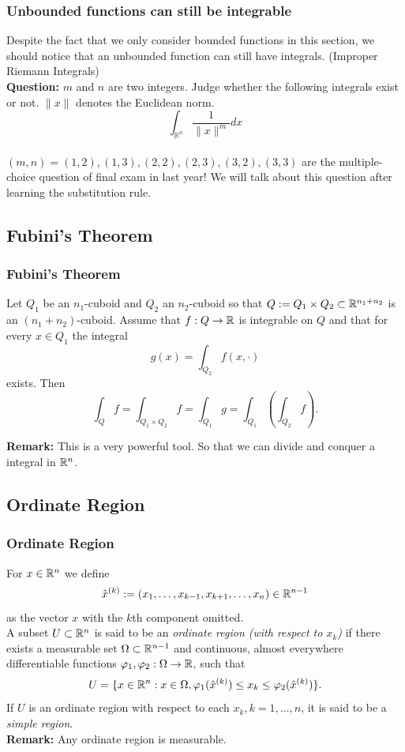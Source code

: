 \documentclass[12pt, t]{beamer}
\renewcommand{\emph}[1]{{\color{Turquoise3}\textsl{#1}}}
\newcommand{\nullspace}{~\\[15pt]}
\newcommand{\Remark}{\textbf{Remark: }}
\newcommand{\Question}{\textbf{Question: }}
\begin{document}
\begin{frame}
    \frametitle{Unbounded functions can still be integrable}
    Despite the fact that we only consider bounded functions in this section, we should notice that an unbounded function can still have integrals. (Improper Riemann Integrals)
    \nullspace
    \Question
    $m$ and $n$ are two integers. Judge whether the following integrals exist or not. $\|x\|$ denotes the Euclidean norm.
    \[
        \int_{\mathbb{R}^{n}} \frac{1}{\|x\|^{m}} d x
    \]
    \nullspace
    $(m, n)=(1,2),(1,3),(2,2),(2,3),(3,2),(3,3)$ are the multiple-choice question of final exam in last year! We will talk about this question after learning the substitution rule.

\end{frame}

\subsection{Fubini's Theorem}
\begin{frame}
    \frametitle{Fubini's Theorem}
    Let $Q_1$ be an $n_1$-cuboid and $Q_2$ an $n_2$-cuboid so that $Q:=Q_1\times Q_2\subset\mathbb{R}^{n_1+n_2}$ is an $(n_1+n_2)$-cuboid. Assume that $f:Q\to\mathbb{R}$ is integrable on $Q$ and that for every $x\in Q_1$ the integral
    \[g(x)=\int_{Q_2}f(x,\cdot)\]
    exists. Then
    \[\int_Qf=\int_{Q_1\times Q_2}f=\int_{Q_1}g=\int_{Q_1}\left(\int_{Q_2}f\right).\]

    \Remark This is a very powerful tool. So that we can divide and conquer a integral in $\mathbb{R}^n$.
\end{frame}

\subsection{Ordinate Region}
\begin{frame}
    \frametitle{Ordinate Region}
    For $x\in\mathbb{R}^n$ we define
    \[\hat{x}^{(k)}:=(x_1,\ldots,x_{k-1},x_{k+1},\ldots,
        x_n)\in\mathbb{R}^{n-1}\]
    as the vector $x$ with the $k$th component omitted.\\[4pt]
    A subset $U\subset\mathbb{R}^n$ is said to be an \emph{ordinate region (with respect to $x_k$)} if there exists a measurable set $\Omega\subset\mathbb{R}^{n-1}$ and continuous, almost everywhere dif{}ferentiable functions $\varphi_1,\varphi_2:\Omega\to\mathbb{R}$, such that
    \[U=\{x\in\mathbb{R}^n:x\in\Omega,\varphi_1(\hat{x}^{(k)})\leq
        x_k\leq\varphi_2(\hat{x}^{(k)})\}.\]
    If $U$ is an ordinate region with respect to each $x_k,k=1,\ldots,n$, it is said to be a \emph{simple region}.\\[6pt]
    \Remark Any ordinate region is measurable.
\end{frame}
\end{document}
